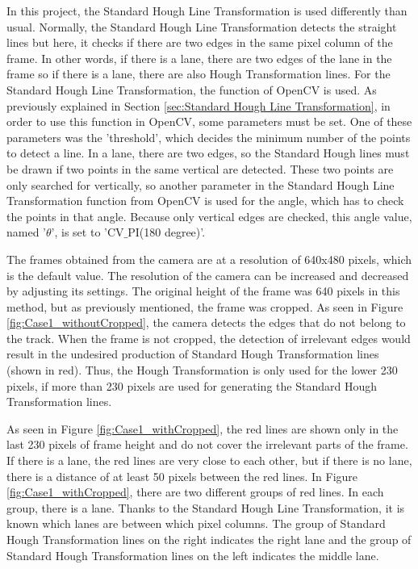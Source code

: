 In this project, the Standard Hough Line Transformation is used differently than usual. Normally, the Standard Hough Line Transformation detects the straight lines but here, it checks if there are two edges in the same pixel column of the frame. In other words, if there is a lane, there are two edges of the lane in the frame so if there is a lane, there are also Hough Transformation lines. For the Standard Hough Line Transformation, the function of OpenCV is used. As previously explained in Section \ref{sec:Standard Hough Line Transformation}, in order to use this function in OpenCV, some parameters must be set. One of these parameters was the 'threshold', which decides the minimum number of the points to detect a line. In a lane, there are two edges, so the Standard Hough lines must be drawn if two points in the same vertical are detected. These two points are only searched for vertically, so another parameter in the Standard Hough Line Transformation function from OpenCV is used for the angle, which has to check the points in that angle. Because only vertical edges are checked, this angle value, named '$\theta$', is set to 'CV$\_$PI(180 degree)'.


 
The frames obtained from the camera are at a resolution of 640x480 pixels, which is the default value. The resolution of the camera can be increased and decreased by adjusting its settings.
The original height of the frame was 640 pixels in this method, but as previously mentioned, the frame was cropped. As seen in Figure \ref{fig:Case1_withoutCropped}, the camera detects the edges that do not belong to the track. When the frame is not cropped, the detection of irrelevant edges would result in the undesired production of Standard Hough Transformation lines (shown in red).  Thus, the Hough Transformation is only used for the lower 230 pixels, if more than 230 pixels are used for generating the Standard Hough Transformation lines. 

As seen in  Figure \ref{fig:Case1_withCropped},  the red lines are shown only in the last 230 pixels of frame height and do not cover the irrelevant parts of the frame. If there is a lane, the red lines are very close to each other, but if there is no lane, there is a distance of at least 50 pixels between the red lines. In Figure \ref{fig:Case1_withCropped}, there are two different groups of red lines. In each group, there is a lane. Thanks to the Standard Hough Line Transformation, it is known which lanes are between which pixel columns. The group of Standard Hough Transformation lines on the right indicates the right lane and the group of Standard Hough Transformation lines on the left indicates the middle lane. 


